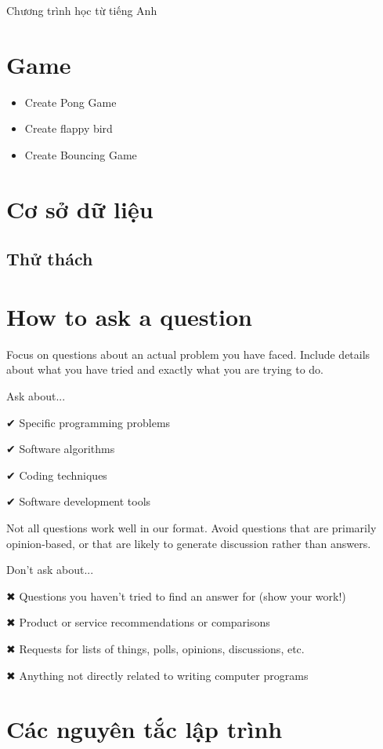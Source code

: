 Chương trình học từ tiếng Anh

\section{Game}

\begin{itemize}
  \item Create Pong Game
  \item Create flappy bird
  \item Create Bouncing Game
\end{itemize}


\section{Cơ sở dữ liệu}

\subsection{Thử thách}


\section{How to ask a question}

Focus on questions about an actual problem you have faced. Include details about what you have tried and exactly what you are trying to do.

Ask about...

✔ Specific programming problems

✔ Software algorithms

✔ Coding techniques

✔ Software development tools

Not all questions work well in our format. Avoid questions that are primarily opinion-based, or that are likely to generate discussion rather than answers.

Don't ask about...

✖ Questions you haven't tried to find an answer for (show your work!)

✖ Product or service recommendations or comparisons

✖ Requests for lists of things, polls, opinions, discussions, etc.

✖ Anything not directly related to writing computer programs

\section{Các nguyên tắc lập trình}

